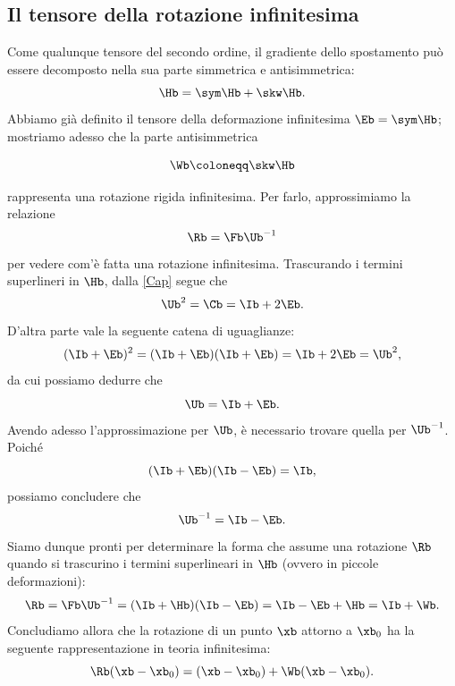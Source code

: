 \subsection{Il tensore della rotazione infinitesima }
Come qualunque tensore del secondo ordine, il gradiente dello spostamento può essere decomposto nella sua parte simmetrica e antisimmetrica:
\begin{equation}
	\Hb=\sym \Hb+\skw \Hb.
\end{equation}
Abbiamo già definito il tensore della deformazione infinitesima $\Eb=\sym \Hb$; mostriamo adesso che la parte antisimmetrica
\begin{definition}
	\begin{equation}
\Wb\coloneqq\skw \Hb
\end{equation}
\end{definition}
rappresenta una rotazione rigida infinitesima. Per farlo, approssimiamo la relazione
\begin{equation}
\Rb=\Fb\Ub^{-1}
\end{equation}
per vedere com'è fatta una rotazione infinitesima. Trascurando i termini superlineri in $\Hb$, dalla \eqref{Cap} segue che
\begin{equation}
\Ub^2=\Cb=\Ib+2\Eb.
\end{equation}
D'altra parte vale la seguente catena di uguaglianze:
\begin{equation}
(\Ib+\Eb)^2=(\Ib+\Eb)(\Ib+\Eb)=\Ib+2\Eb=\Ub^2,
\end{equation}
da cui possiamo dedurre che 
\begin{equation}
	\Ub=\Ib+\Eb.
\end{equation}
Avendo adesso l'approssimazione per $\Ub$, è necessario trovare quella per $\Ub^{-1}$.  Poiché
\begin{equation}
(\Ib+\Eb)(\Ib-\Eb)=\Ib,
\end{equation}
possiamo concludere che
\begin{equation}
\Ub^{-1}=\Ib-\Eb.
\end{equation}
Siamo dunque pronti per determinare la forma che assume una rotazione $\Rb$ quando si trascurino i termini superlineari in $\Hb$ (ovvero in piccole deformazioni):
\begin{equation}
\Rb=\Fb\Ub^{-1}=(\Ib+\Hb)(\Ib-\Eb)=\Ib-\Eb+\Hb=\Ib+\Wb.
\end{equation}
Concludiamo allora che la rotazione di un punto $\xb$ attorno a $\xb_0$ ha la seguente rappresentazione in teoria infinitesima:
\begin{equation}
\Rb(\xb-\xb_0)=(\xb-\xb_0)+\Wb(\xb-\xb_0).
\end{equation}

